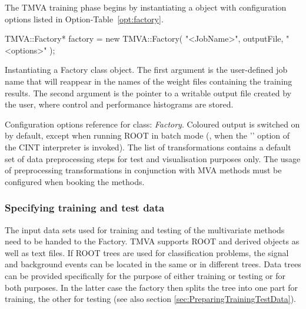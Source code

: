 The TMVA training phase begins by instantiating a  object
with configuration options listed in Option-Table~\ref{opt:factory}.
\begin{codeexample}
\begin{tmvacode}
TMVA::Factory* factory 
           = new TMVA::Factory( "<JobName>", outputFile, "<options>" );
\end{tmvacode}
\caption[.]{\codeexampleCaptionSize Instantiating a Factory class object. The first 
            argument is the user-defined job name that will reappear in the names of 
            the weight files containing the training results. The second argument is the
            pointer to a writable  output file created by the user, where 
            control and performance histograms are stored. }
\end{codeexample}

\begin{option}[t]

\caption[.]{\optionCaptionSize 
     Configuration options reference for class: {\em Factory}.  
     Coloured output is switched on by default, except when running ROOT in batch
     mode (\ie, when the '' option of the CINT interpreter is invoked). 
     The list of transformations contains a default set of data preprocessing steps 
     for test and visualisation purposes only. The usage of preprocessing transformations
     in conjunction with MVA methods must be configured when booking the methods.
}
\label{opt:factory}
\end{option}

\subsubsection{Specifying training and test data}

The input data sets used for training and testing of the multivariate methods
need to be handed to the Factory. TMVA supports ROOT  and derived 
 objects as well as text files. If ROOT trees are used for classification
problems, the signal and background events can be located in the same or in different 
trees. Data trees can be provided specifically for the purpose of either training or testing or for both purposes. In the latter case the factory then splits the tree into one part for training, the other for testing (see also section \ref{sec:PreparingTrainingTestData}).

